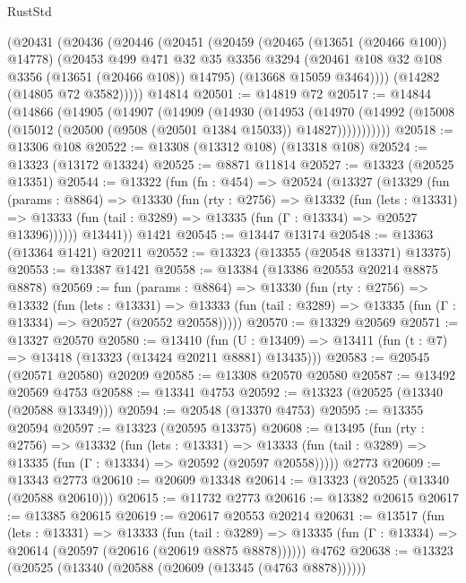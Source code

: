 \begin{lexlean}{RustStd}
\begin{coremodule}
    (@20431
      (@20436
        (@20446
          (@20451
            (@20459
              (@20465 (@13651 (@20466 @100)) @14778)
              (@20453
                @499
                @471
                @32
                @35
                @3356
                @3294
                (@20461 @108 @32 @108 @3356 (@13651 (@20466 @108)) @14795)
                (@13668 @15059 @3464))))
          (@14282 (@14805 @72 @3582)))))
    @14814
@20501 := @14819 @72
@20517 := @14844
    (@14866
      (@14905
        (@14907
          (@14909
            (@14930
              (@14953
                (@14970
                  (@14992 (@15008 (@15012 (@20500 (@9508 (@20501 @1384 @15033)) @14827)))))))))))
@20518 := @13306 @108
@20522 := @13308 (@13312 @108) (@13318 @108)
@20524 := @13323 (@13172 @13324)
@20525 := @8871 @11814
@20527 := @13323 (@20525 @13351)
@20544 := @13322
    (fun (fn : @454) =>
    @20524
      (@13327
        (@13329
          (fun (params : @8864) =>
          @13330
            (fun (rty : @2756) =>
            @13332
              (fun (lets : @13331) =>
              @13333 (fun (tail : @3289) => @13335 (fun (Γ : @13334) => @20527 @13396))))))
        @13441))
    @1421
@20545 := @13447 @13174
@20548 := @13363 (@13364 @1421) @20211
@20552 := @13323 (@13355 (@20548 @13371) @13375)
@20553 := @13387 @1421
@20558 := @13384 (@13386 @20553 @20214 @8875 @8878)
@20569 := fun (params : @8864) =>
  @13330
    (fun (rty : @2756) =>
    @13332
      (fun (lets : @13331) =>
      @13333 (fun (tail : @3289) => @13335 (fun (Γ : @13334) => @20527 (@20552 @20558)))))
@20570 := @13329 @20569
@20571 := @13327 @20570
@20580 := @13410
    (fun (U : @13409) => @13411 (fun (t : @7) => @13418 (@13323 (@13424 @20211 @8881) @13435)))
@20583 := @20545 (@20571 @20580) @20209
@20585 := @13308 @20570 @20580
@20587 := @13492 @20569 @4753
@20588 := @13341 @4753
@20592 := @13323 (@20525 (@13340 (@20588 @13349)))
@20594 := @20548 (@13370 @4753)
@20595 := @13355 @20594
@20597 := @13323 (@20595 @13375)
@20608 := @13495
    (fun (rty : @2756) =>
    @13332
      (fun (lets : @13331) =>
      @13333 (fun (tail : @3289) => @13335 (fun (Γ : @13334) => @20592 (@20597 @20558)))))
    @2773
@20609 := @13343 @2773
@20610 := @20609 @13348
@20614 := @13323 (@20525 (@13340 (@20588 @20610)))
@20615 := @11732 @2773
@20616 := @13382 @20615
@20617 := @13385 @20615
@20619 := @20617 @20553 @20214
@20631 := @13517
    (fun (lets : @13331) =>
    @13333
      (fun (tail : @3289) =>
      @13335 (fun (Γ : @13334) => @20614 (@20597 (@20616 (@20619 @8875 @8878))))))
    @4762
@20638 := @13323 (@20525 (@13340 (@20588 (@20609 (@13345 (@4763 @8878))))))

\end{coremodule}
\end{lexlean}
